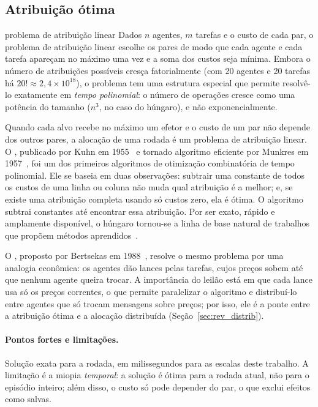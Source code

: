 \subsection{Atribuição ótima}

\begin{conceitobox}{problema de atribuição linear}
Dados $n$ agentes, $m$ tarefas e o custo de cada par, o problema de atribuição linear escolhe os pares de modo que cada
agente e cada tarefa apareçam no máximo uma vez e a soma dos custos seja mínima. Embora o número de atribuições possíveis
cresça fatorialmente (com 20 agentes e 20 tarefas há $20!\approx2{,}4\times10^{18}$), o problema tem uma estrutura especial
que permite resolvê-lo exatamente em \emph{tempo polinomial}: o número de operações cresce como uma potência do tamanho
($n^3$, no caso do húngaro), e não exponencialmente.
\end{conceitobox}

Quando cada alvo recebe no máximo um efetor e o custo de um par não depende dos outros pares, a alocação de uma rodada é um
problema de atribuição linear. O , publicado por Kuhn em 1955~\cite{kuhn1955} e tornado algoritmo
eficiente por Munkres em 1957~\cite{munkres1957}, foi um dos primeiros algoritmos de otimização combinatória de tempo
polinomial. Ele se baseia em duas observações: subtrair uma constante de todos os custos de uma linha ou coluna não muda
qual atribuição é a melhor; e, se existe uma atribuição completa usando só custos zero, ela é ótima. O algoritmo subtrai
constantes até encontrar essa atribuição. Por ser exato, rápido e amplamente disponível, o húngaro tornou-se a linha de base
natural de trabalhos que propõem métodos aprendidos~\cite{liu2023drones}.

O , proposto por Bertsekas em 1988~\cite{bertsekas1988}, resolve o mesmo problema por uma
analogia econômica: os agentes dão lances pelas tarefas, cujos preços sobem até que nenhum agente queira trocar. A
importância do leilão está em que cada lance usa só os preços correntes, o que permite paralelizar o algoritmo e
distribuí-lo entre agentes que só trocam mensagens sobre preços; por isso, ele é a ponte entre a atribuição ótima e a
alocação distribuída (Seção~\ref{sec:rev_distrib}).

\paragraph{Pontos fortes e limitações.} Solução exata para a rodada, em milissegundos para as escalas deste trabalho. A
limitação é a miopia \emph{temporal}: a solução é ótima para a rodada atual, não para o episódio inteiro; além disso, o
custo só pode depender do par, o que exclui efeitos como salvas.

